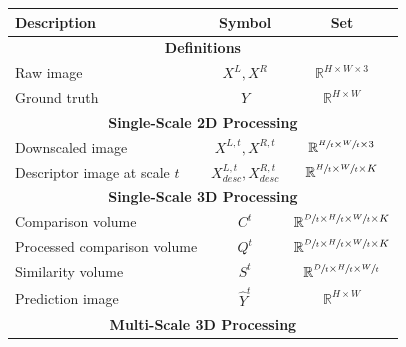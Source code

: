 \documentclass[10pt]{article}
\begin{document}
\begin{table}[]
    \centering
    \begin{tabular}{ l|c|c }
    Description & Symbol & Set \rule{0pt}{2ex}\\
    
    \hline
    \multicolumn{3}{c}{ \textbf{Definitions} } \rule{0pt}{2.4ex}\\
    \hline
    
    Raw image & $X^L, X^R$ & $\mathbb{R}^{H \times W \times 3}$ \rule{0pt}{2.5ex} \\
    
    Ground truth & $Y$ & $\mathbb{R}^{H \times W}$ \rule{0pt}{2.5ex} \\
    
    \hline
    \multicolumn{3}{c}{ \textbf{Single-Scale 2D Processing} } \rule{0pt}{2.4ex}\\
    \hline
    
    Downscaled image & $X^{L,t}, X^{R, t}$ & $\mathbb{R}^{\sfrac{H}{t} \times \sfrac{W}{t} \times 3}$ \rule{0pt}{3ex} \\
    
    Descriptor image at scale $t$ & $X^{L,t}_{desc}, X^{R, t}_{desc}$ & $\mathbb{R}^{\sfrac{H}{t} \times \sfrac{W}{t} \times K}$ \rule{0pt}{3.5ex} \rule[-1.3ex]{0pt}{0pt}\\
    
    \hline
    \multicolumn{3}{c}{ \textbf{Single-Scale 3D Processing} } \rule{0pt}{2.4ex}\\
    \hline
    
    Comparison volume & $C^{t}$ & $ \mathbb{R}^{ \sfrac{D}{t} \times \sfrac{H}{t} \times \sfrac{W}{t} \times K } $ \rule{0pt}{3ex} \\
    
    Processed comparison volume & $Q^{t}$ & $ \mathbb{R}^{ \sfrac{D}{t} \times \sfrac{H}{t} \times \sfrac{W}{t} \times K } $ \rule{0pt}{3ex} \\
    
    Similarity volume & $S^{t}$ & $ \mathbb{R}^{ \sfrac{D}{t} \times \sfrac{H}{t} \times \sfrac{W}{t}} $  \rule{0pt}{3.5ex} \\
    
    Prediction image & $\hat{Y}^{t}$ & $\mathbb{R}^{H \times W}$ \rule{0pt}{3.5ex} \\
    
    \hline
    \multicolumn{3}{c}{ \textbf{Multi-Scale 3D Processing} } \rule{0pt}{2.4ex} \\
    \hline
    

\end{tabular}
\end{table}
\end{document}
